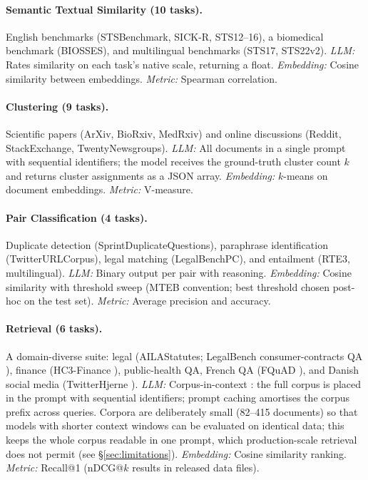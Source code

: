 \paragraph{Semantic Textual Similarity (10 tasks).}
English benchmarks (STSBenchmark, SICK-R, STS12--16), a biomedical benchmark (BIOSSES), and multilingual benchmarks (STS17, STS22v2).
\emph{LLM:} Rates similarity on each task's native scale, returning a float.
\emph{Embedding:} Cosine similarity between embeddings.
\emph{Metric:} Spearman correlation.

\paragraph{Clustering (9 tasks).}
Scientific papers (ArXiv, BioRxiv, MedRxiv) and online discussions (Reddit, StackExchange, TwentyNewsgroups).
\emph{LLM:} All documents in a single prompt with sequential identifiers; the model receives the ground-truth cluster count $k$ and returns cluster assignments as a JSON array.
\emph{Embedding:} $k$-means on document embeddings.
\emph{Metric:} V-measure.

\paragraph{Pair Classification (4 tasks).}
Duplicate detection (SprintDuplicateQuestions), paraphrase identification (TwitterURLCorpus), legal matching (LegalBenchPC), and entailment (RTE3, multilingual).
\emph{LLM:} Binary output per pair with reasoning.
\emph{Embedding:} Cosine similarity with threshold sweep (MTEB convention; best threshold chosen post-hoc on the test set).
\emph{Metric:} Average precision and accuracy.

\paragraph{Retrieval (6 tasks).}
A domain-diverse suite: legal (AILAStatutes; LegalBench consumer-contracts QA \citep{guha2023legalbench}), finance (HC3-Finance \citep{guo2023hc3}), public-health QA, French QA (FQuAD \citep{dhoffschmidt2020fquad}), and Danish social media (TwitterHjerne \citep{holm2024danoliterate}).
\emph{LLM:} Corpus-in-context \citep{lee2024longcontextlanguagemodelssubsume}: the full corpus is placed in the prompt with sequential identifiers; prompt caching \citep{gim2024promptcache} amortises the corpus prefix across queries.
Corpora are deliberately small (82--415 documents) so that models with shorter context windows can be evaluated on identical data; this keeps the whole corpus readable in one prompt, which production-scale retrieval does not permit (see \S\ref{sec:limitations}).
\emph{Embedding:} Cosine similarity ranking.
\emph{Metric:} Recall@1 (nDCG@$k$ results in released data files).


